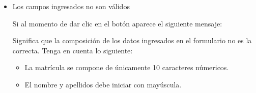 \begin{itemize}
            	\item Los campos ingresados no son válidos

                	Si al momento de dar clic en el botón  aparece el siguiente mensaje:

                	Significa que la composición de los datos ingresados en el formulario no es la correcta. Tenga en cuenta lo siguiente:

                	\begin{itemize}
                		\item La matrícula se compone de únicamente 10 caracteres númericos.
                		\item El nombre y apellidos debe iniciar con mayúscula.
                	\end{itemize}

            \end{itemize}